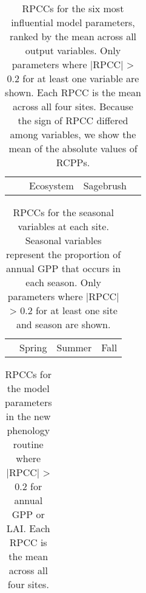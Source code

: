 \documentclass[]{article}
\begin{document}
\begin{table}[ht]
	\begin{threeparttable} %
	\caption{RPCCs for the six most influential model parameters, ranked by the mean across all output variables. Only parameters where |RPCC| > 0.2 for at least one variable are shown. Each RPCC is the mean across all four sites. Because the sign of RPCC differed among variables, we show the mean of the absolute values of RCPPs.} 
	\begin{tabular}{lrrrrrrrr}
		\toprule
		&& \multicolumn{2}{c}{Ecosystem} & \multicolumn{4}{c}{Sagebrush} \\
		\cmidrule(lr){3-4} \cmidrule(lr){5-8}
		
	\end{tabular}
\end{threeparttable}
\end{table}

\begin{table}[ht]
	\begin{threeparttable}
	\caption{RPCCs for the seasonal variables at each site. Seasonal variables represent the proportion of annual GPP that occurs in each season. Only parameters where |RPCC| > 0.2 for at least one site and season are shown.} 
	\begin{tabularx}{\textwidth}{lrrrrrrrrrrrr}
		\toprule
		& \multicolumn{4}{c}{Spring} & \multicolumn{4}{c}{Summer} & \multicolumn{4}{c}{Fall} \\
		\cmidrule(lr){2-5} \cmidrule(lr){6-9} \cmidrule(lr){10-13}
		
	\end{tabularx}
\end{threeparttable}
\end{table}

\begin{table}[ht]
	\begin{threeparttable}
	\caption{RPCCs for the model parameters in the new phenology routine where |RPCC| > 0.2 for annual GPP or LAI. Each RPCC is the mean across all four sites.} 
	\begin{tabular}{lrr}
		\toprule
		
	\end{tabular}
\end{threeparttable}
\end{table}
\end{document}
